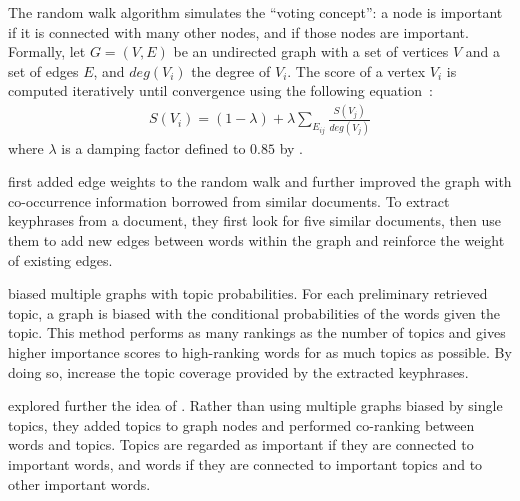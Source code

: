     The random walk algorithm simulates the ``voting concept'': a node is 
    important if it is connected with many other nodes, and if those nodes are 
    important.
    Formally, let $G=(V,E)$ be an undirected graph with a set of vertices $V$ and a 
    set of edges $E$, and $deg(V_i)$ the degree of $V_i$.
    The score of a vertex $V_i$ is computed iteratively until convergence 
    using the following equation~:
    \begin{align}
      S(V_i) = (1 - \lambda) + \lambda \sum_{E_{ij}}{\frac{S(V_j)}{deg(V_j)}}
    \end{align}
    where $\lambda$ is a damping factor defined to $0.85$ by
    .
    
     first added edge weights to the random walk
    and further improved the graph with co-occurrence information borrowed from
    similar documents. To extract keyphrases from a document, they first look for
    five similar documents, then use them to add new edges between words within
    the graph and reinforce the weight of existing edges.
    
     biased multiple graphs with topic
    probabilities. For each preliminary retrieved topic, a graph is biased with
    the conditional probabilities of the words given the topic. This method
    performs as many rankings as the number of topics and gives higher importance
    scores to high-ranking words for as much topics as possible. By doing so,
    increase the topic coverage provided by the extracted keyphrases.
    
    
    explored further the idea of
    . 
    Rather than using  multiple graphs biased by single topics, they added topics to graph nodes and performed co-ranking between words and topics.
    Topics %
    are regarded as important if they are connected to important words, and 
    words if they are connected to important topics and to
    other important words.
    
